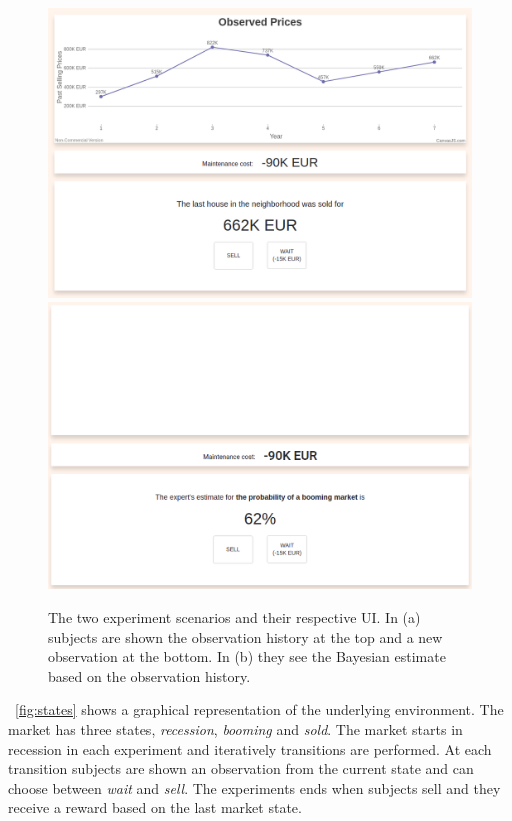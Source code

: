 \begin{figure}[!htbp]
    \centering
    \includegraphics[width=0.99\linewidth]{img/methods/experiment_obs_1.png}\\
    \includegraphics[width=0.99\linewidth]{img/methods/experiment_bel_1.png}\\
    \caption{The two experiment scenarios and their respective UI. In (a) subjects are shown the observation history at the top and a new observation at the bottom. In (b) they see the Bayesian estimate based on the observation history.}\label{fig:user-interface}
\end{figure}

~\autoref{fig:states} shows a graphical representation of the underlying environment. The market has three states, \textit{recession}, \textit{booming} and \textit{sold}. The market starts in recession in each experiment and iteratively transitions are performed. At each transition subjects are shown an observation from the current state and can choose between \textit{wait} and \textit{sell}. The experiments ends when subjects sell and they receive a reward based on the last market state.

